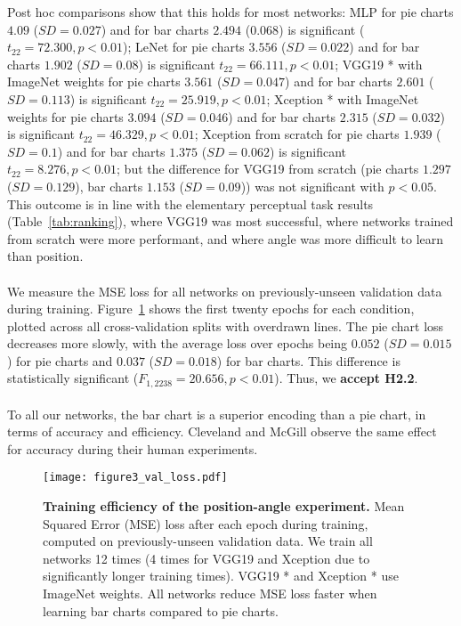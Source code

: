 Post hoc comparisons show that this holds for most networks: 
MLP for pie charts $4.09$ ($SD=0.027$) and for bar charts $2.494$ ($0.068$) is significant ($t_{22}=72.300,p<0.01$);
LeNet for pie charts $ 3.556 $ ($SD= 0.022 $) and for bar charts $ 1.902 $ ($SD= 0.08 $) is significant $t_{22}=66.111, p<0.01$;
VGG19 * with ImageNet weights for pie charts $ 3.561 $ ($SD= 0.047 $) and for bar charts $ 2.601 $ ($SD= 0.113 $) is significant $t_{22}=25.919,p<0.01$;
Xception * with ImageNet weights for pie charts  $ 3.094 $ ($SD= 0.046 $) and for bar charts $ 2.315 $ ($SD= 0.032 $) is significant $t_{22}=46.329,p<0.01$;
Xception from scratch for pie charts $ 1.939 $ ($SD= 0.1 $) and for bar charts $ 1.375 $ ($SD= 0.062 $) is significant $t_{22}=8.276,p<0.01$; but
the difference for VGG19 from scratch (pie charts $ 1.297 $ ($SD= 0.129 $), bar charts $ 1.153 $ ($SD= 0.09 $)) was not significant with $p<0.05$. 
This outcome is in line with the elementary perceptual task results (Table~\ref{tab:ranking}), where VGG19 was most successful, where networks trained from scratch were more performant, and where angle was more difficult to learn than position.
\\~\\
 We measure the MSE loss for all networks on previously-unseen validation data during training. Figure~\ref{fig:figure3_val_loss} shows the first twenty epochs for each condition, plotted across all cross-validation splits with overdrawn lines. The pie chart loss decreases more slowly, with the average loss over epochs being $0.052$ ($SD=0.015$) for pie charts and $0.037$ ($SD=0.018$) for bar charts. This difference is statistically significant ($F_{1,2238}=20.656, p<0.01$). Thus, we \textbf{accept H2.2}.
\\~\\
To all our networks, the bar chart is a superior encoding than a pie chart, in terms of accuracy and efficiency. Cleveland and McGill observe the same effect for accuracy during their human experiments.


\begin{figure}[tb]
	  \texttt{[image: figure3\_val\_loss.pdf]}
  \caption{\textbf{Training efficiency of the position-angle experiment.} Mean Squared Error (MSE) loss after each epoch during training, computed on previously-unseen validation data. We train all networks 12 times (4 times for VGG19 and Xception due to significantly longer training times). VGG19 * and Xception * use ImageNet weights. All networks reduce MSE loss faster when learning bar charts compared to  pie charts.}
	\label{fig:figure3_val_loss}
\end{figure}

